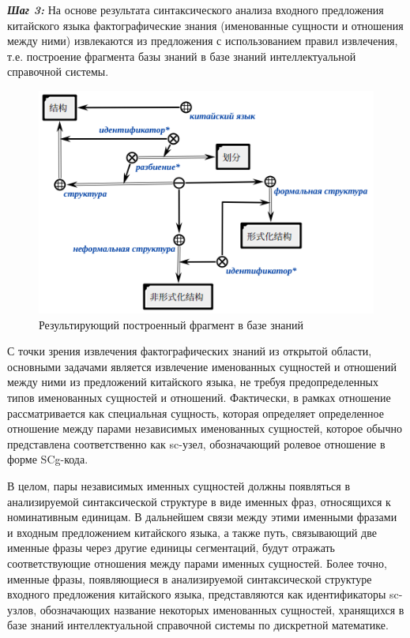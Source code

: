 \textbf{\textit{Шаг 3:}} На основе результата синтаксического анализа входного предложения китайского языка фактографические знания (именованные сущности и отношения между ними) извлекаются из предложения с использованием правил извлечения, т.е. построение фрагмента базы знаний в базе знаний интеллектуальной справочной системы.


\begin{figure}[H]
	\centering
	\includegraphics[scale=0.7]{images/part4/chapter_chinese/generated_sc_structure.png}
	\caption{Результирующий построенный фрагмент в базе знаний}
	\label{fig:generated-structure}
\end{figure}

С точки зрения извлечения фактографических знаний из открытой области, основными задачами является извлечение именованных сущностей и отношений между ними из предложений китайского языка, не требуя предопределенных типов именованных сущностей и отношений. Фактически, в рамках  отношение рассматривается как специальная сущность, которая определяет определенное отношение между парами независимых именованных сущностей, которое обычно представлена соответственно как sc-узел, обозначающий ролевое отношение в форме SCg-кода.

В целом, пары независимых именных сущностей должны появляться в анализируемой синтаксической структуре в виде именных фраз, относящихся к номинативным единицам. В дальнейшем связи между этими именными фразами и входным предложением китайского языка, а также путь, связывающий две именные фразы через другие единицы сегментаций, будут отражать соответствующие отношения между парами именных сущностей. Более точно, именные фразы, появляющиеся в анализируемой синтаксической структуре входного предложения китайского языка, представляются как идентификаторы sc-узлов, обозначающих название некоторых именованных сущностей, хранящихся в базе знаний интеллектуальной справочной системы по дискретной математике.

